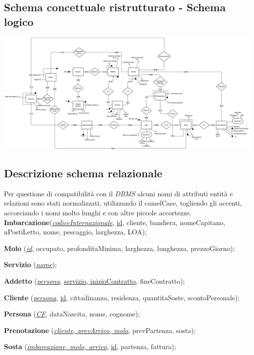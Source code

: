 \subsection{Schema concettuale ristrutturato - Schema logico}
\includegraphics[width=\textwidth]{img/erlogico.png}


\subsection{Descrizione schema relazionale}

Per questione di compatibilità con il \textit{DBMS} alcuni nomi di attributi entità e relazioni sono stati normalizzati, utilizzando il camelCase, togliendo gli accenti, accorciando i nomi molto lunghi e con altre piccole accortezze.\\

\textbf{Imbarcazione}(\underline{\textit{codiceInternazionale}}, \underline{id}, cliente, bandiera, nomeCapitano, nPostiLetto, nome, pescaggio, larghezza, LOA);

\textbf{Molo} (\underline{\textit{id}}, occupato, profonditaMinima, larghezza, lunghezza, prezzoGiorno);

\textbf{Servizio} (\underline{\textit{nome}});

\textbf{Addetto} (\underline{\textit{persona}}, \underline{servizio, inizioContratto}, fineContratto);

\textbf{Cliente} (\underline{\textit{persona}}, \underline{id}, cittadinanza, residenza, quantitaSoste, scontoPersonale);

\textbf{Persona} (\underline{\textit{CF}}, dataNascita, nome, cognome);

\textbf{Prenotazione} (\underline{\textit{cliente, prevArrivo, molo}}, prevPartenza, sosta);

\textbf{Sosta} (\underline{\textit{imbarcazione, molo, arrivo}}, \underline{id}, partenza, fattura);

